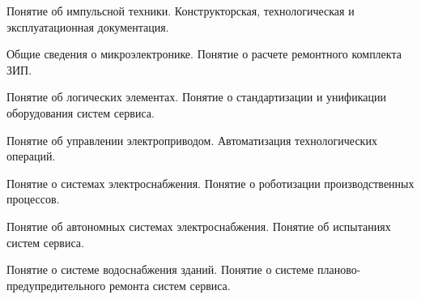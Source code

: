 \documentclass[
	14pt,
	a4paper,
	]
	{scrartcl}
\begin{document}
\vfill

\newpage


\shapk
{}
\setcounter{zad}{0}

\vfill
\z Понятие об импульсной техники.
 \vfill
\z Конструкторская, технологическая и эксплуатационная документация.
 \vfill

\vfill

\newpage


\shapk
{}
\setcounter{zad}{0}

\vfill
\z Общие сведения о микроэлектронике.
 \vfill
\z Понятие о расчете ремонтного комплекта ЗИП.
 \vfill

\vfill

\newpage


\shapk
{}
\setcounter{zad}{0}

\vfill
\z Понятие об логических элементах.
 \vfill
\z Понятие о стандартизации и унификации оборудования систем сервиса.
 \vfill

\vfill

\newpage


\shapk
{}
\setcounter{zad}{0}

\vfill
\z Понятие об управлении электроприводом.
 \vfill
\z Автоматизация технологических операций.
 \vfill

\vfill

\newpage


\shapk
{}
\setcounter{zad}{0}

\vfill
\z Понятие о системах электроснабжения.
 \vfill
\z Понятие о роботизации производственных процессов.
 \vfill

\vfill

\newpage


\shapk
{}
\setcounter{zad}{0}

\vfill
\z Понятие об автономных системах электроснабжения.
 \vfill
\z Понятие об испытаниях систем сервиса.
 \vfill

\vfill

\newpage


\shapk
{}
\setcounter{zad}{0}

\vfill
\z Понятие о системе водоснабжения зданий.
 \vfill
\z Понятие о системе планово-предупредительного ремонта систем сервиса.
 \vfill

\vfill

\newpage
\end{document}

